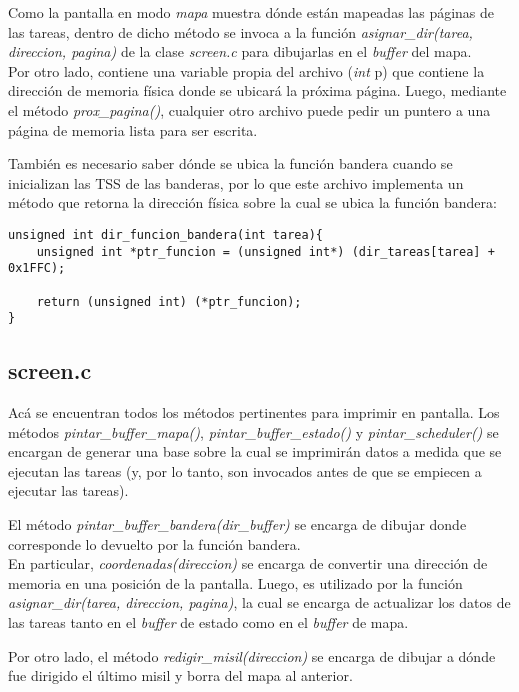 \documentclass[a4paper]{article}
\newenvironment{codesnippet}{%
	\begin{Sbox}\begin{minipage}{\textwidth}\sffamily\small}%
	{\end{minipage}\end{Sbox}%
		\begin{center}%
		\vspace{-0.4cm}\colorbox{litegrey}{\TheSbox}\end{center}\vspace{0.3cm}}
\begin{document}
Como la pantalla en modo \textit{mapa} muestra dónde están mapeadas las páginas de las tareas, dentro de dicho método se invoca a la función \textit{asignar_dir(tarea, direccion, pagina)} de la clase \textit{screen.c} para dibujarlas en el \textit{buffer} del mapa.
\\

Por otro lado, contiene una variable propia del archivo (\textit{int} p) que contiene la dirección de memoria física donde se ubicará la próxima página. Luego, mediante el método \textit{prox_pagina()}, cualquier otro archivo puede pedir un puntero a una página de memoria lista para ser escrita.

También es necesario saber dónde se ubica la función bandera cuando se inicializan las TSS de las banderas, por lo que este archivo implementa un método que retorna la dirección física sobre la cual se ubica la función bandera:
\begin{codesnippet}
\begin{verbatim}
unsigned int dir_funcion_bandera(int tarea){
    unsigned int *ptr_funcion = (unsigned int*) (dir_tareas[tarea] + 0x1FFC);
    
    return (unsigned int) (*ptr_funcion);
}
\end{verbatim}
\end{codesnippet}

\subsection{screen.c}
Acá se encuentran todos los métodos pertinentes para imprimir en pantalla. Los métodos \textit{pintar_buffer_mapa()}, \textit{pintar_buffer_estado()} y \textit{pintar_scheduler()} se encargan de generar una base sobre la cual se imprimirán datos a medida que se ejecutan las tareas (y, por lo tanto, son invocados antes de que se empiecen a ejecutar las tareas).

El método \textit{pintar_buffer_bandera(dir_buffer)} se encarga de dibujar donde corresponde lo devuelto por la función bandera.
\\

En particular, \textit{coordenadas(direccion)} se encarga de convertir una dirección de memoria en una posición de la pantalla. Luego, es utilizado por la función \textit{asignar_dir(tarea, direccion, pagina)}, la cual se encarga de actualizar los datos de las tareas tanto en el \textit{buffer} de estado como en el \textit{buffer} de mapa.

Por otro lado, el método \textit{redigir_misil(direccion)} se encarga de dibujar a dónde fue dirigido el último misil y borra del mapa al anterior.
\end{document}
